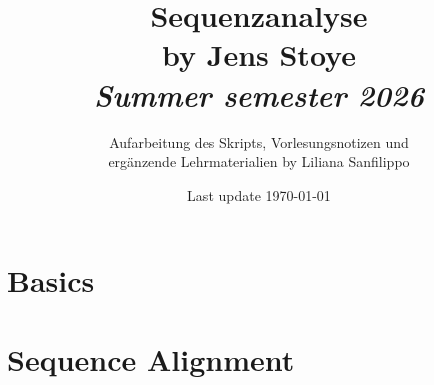 
\usepackage[ngerman]{babel}







\usepackage{booktabs}


\usepackage{biblatex}

\title{Sequenzanalyse \\ \small{by Jens Stoye} \\ \textit{\footnotesize{Summer semester 2026} } }
\author{Aufarbeitung des Skripts, Vorlesungsnotizen und \\ ergänzende Lehrmaterialien by Liliana Sanfilippo}
\date{Last update \today}

\newcommand\reporttitle{Lecture Sequenzanalyse}
\newcommand\reportsubtitle{}
\newcommand\profs{Vorlesung von Jens Stoye}
\newcommand\reportsubsubtitle{Vorlesungsnotizen und Aufarbeitung}
\newcommand\reportauthors{
    \textbf{Liliana Sanfilippo}
}


    \frontmatter
    
    {\hypersetup{linkcolor=black} %
    \tableofcontents\thispagestyle{empty}}
    \newpage

    \mainmatter



    \chapter{Basics}
    
    

    \chapter{Sequence Alignment}
    
    

